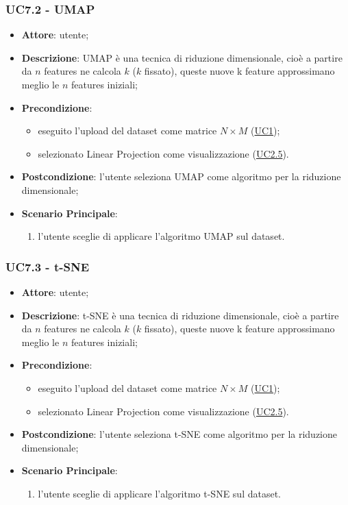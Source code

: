     \subsubsection{UC7.2 - UMAP}
    \label{uc7.2}
    \begin{itemize}
    \item \textbf{Attore}: utente;
    \item \textbf{Descrizione}: UMAP è una tecnica di riduzione dimensionale, cioè a partire da $n$ features ne calcola $k$ ($k$ fissato), queste nuove k feature approssimano meglio le $n$ features iniziali;
    \item \textbf{Precondizione}: 
    \begin{itemize}
        \item eseguito l'upload del dataset come matrice $N\times M$ (\hyperref[uc1]{UC1});
        \item selezionato Linear Projection come visualizzazione (\hyperref[uc2.5]{UC2.5}).
    \end{itemize}  
    \item \textbf{Postcondizione}: l'utente seleziona UMAP come algoritmo per la riduzione dimensionale;
    \item \textbf{Scenario Principale}: 
    \begin{enumerate}
        \item l'utente sceglie di applicare l'algoritmo UMAP sul dataset.
    \end{enumerate}
    \end{itemize}
    
    \subsubsection{UC7.3 - t-SNE}
    \label{uc7.3}
    \begin{itemize}
    \item \textbf{Attore}: utente;
    \item \textbf{Descrizione}: t-SNE è una tecnica di riduzione dimensionale, cioè a partire da $n$ features ne calcola $k$ ($k$ fissato), queste nuove k feature approssimano meglio le $n$ features iniziali;
    \item \textbf{Precondizione}: 
    \begin{itemize}
        \item eseguito l'upload del dataset come matrice $N\times M$ (\hyperref[uc1]{UC1});
        \item selezionato Linear Projection come visualizzazione (\hyperref[uc2.5]{UC2.5}).
    \end{itemize}  
    \item \textbf{Postcondizione}: l'utente seleziona t-SNE come algoritmo per la riduzione dimensionale;
    \item \textbf{Scenario Principale}: 
    \begin{enumerate}
        \item l'utente sceglie di applicare l'algoritmo t-SNE sul dataset.
    \end{enumerate}
    \end{itemize}
    
    
